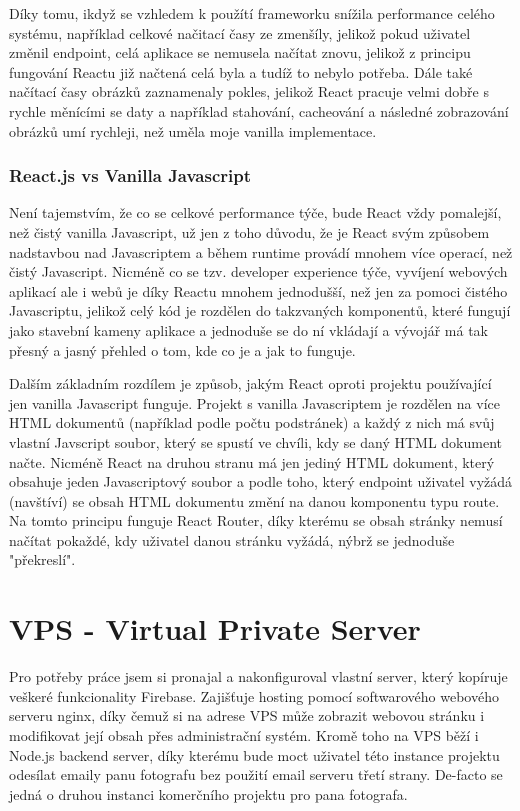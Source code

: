 \documentclass[12pt,a4paper]{report}
\begin{document}
  Díky tomu, ikdyž se vzhledem k použítí frameworku snížila performance celého systému, například celkové
  načitací časy ze zmenšíly, jelikož pokud uživatel změnil endpoint, celá aplikace se nemusela načítat znovu, jelikož
  z principu fungování Reactu již načtená celá byla a tudíž to nebylo potřeba. Dále také načítací časy obrázků zaznamenaly pokles,
  jelikož React pracuje velmi dobře s rychle měnícími se daty a například stahování, cacheování a následné zobrazování obrázků umí 
  rychleji, než uměla moje vanilla implementace.
  
  \subsection{React.js vs Vanilla Javascript}
  Není tajemstvím, že co se celkové performance týče, bude React vždy pomalejší, než čistý vanilla Javascript, už jen 
  z toho důvodu, že je React svým způsobem nadstavbou nad Javascriptem a během runtime provádí mnohem více operací, než čistý Javascript.
  Nicméně co se tzv. developer experience týče, vyvíjení webových aplikací ale i webů je díky Reactu mnohem jednodušší, než jen
  za pomoci čistého Javascriptu, jelikož celý kód je rozdělen do takzvaných komponentů, které fungují jako stavební kameny aplikace a jednoduše se 
  do ní vkládají a vývojář má tak přesný a jasný přehled o tom, kde co je a jak to funguje. 

  Dalším základním rozdílem je způsob, jakým React oproti projektu používající jen vanilla Javascript funguje.
  Projekt s vanilla Javascriptem je rozdělen na více HTML dokumentů (například podle počtu podstránek) a každý z nich má svůj vlastní 
  Javscript soubor, který se spustí ve chvíli, kdy se daný HTML dokument načte.
  Nicméně React na druhou stranu má jen jediný HTML dokument, který obsahuje jeden Javascriptový soubor a podle toho,
  který endpoint uživatel vyžádá (navštíví) se obsah HTML dokumentu změní na danou komponentu typu route. Na tomto principu funguje React Router,
  díky kterému se obsah stránky nemusí načítat pokaždé, kdy uživatel danou stránku vyžádá, nýbrž se jednoduše "překreslí".
 
  \chapter{VPS - Virtual Private Server}
   Pro potřeby práce jsem si pronajal a nakonfiguroval vlastní server, který kopíruje veškeré funkcionality
   Firebase. Zajišťuje hosting pomocí softwarového webového serveru nginx, díky čemuž si na adrese VPS může
   zobrazit webovou stránku i modifikovat její obsah přes administrační systém. Kromě toho na VPS běží i Node.js backend server,
   díky kterému bude moct uživatel této instance projektu odesílat emaily panu fotografu bez použití email serveru třetí strany. 
   De-facto se jedná o druhou instanci komerčního projektu pro pana fotografa. 
\end{document}
